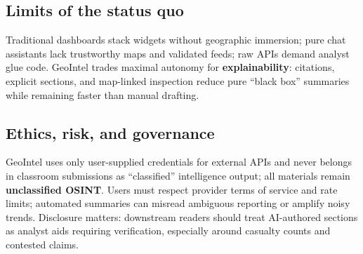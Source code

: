 \subsection{Limits of the status quo}

Traditional dashboards stack widgets without geographic immersion; pure chat assistants lack trustworthy maps and validated feeds; raw APIs demand analyst glue code. GeoIntel trades maximal autonomy for \textbf{explainability}: citations, explicit sections, and map-linked inspection reduce pure ``black box'' summaries while remaining faster than manual drafting.

\subsection{Ethics, risk, and governance}

GeoIntel uses only user-supplied credentials for external APIs and never belongs in classroom submissions as ``classified'' intelligence output; all materials remain \textbf{unclassified OSINT}. Users must respect provider terms of service and rate limits; automated summaries can misread ambiguous reporting or amplify noisy trends. Disclosure matters: downstream readers should treat AI-authored sections as analyst aids requiring verification, especially around casualty counts and contested claims.
